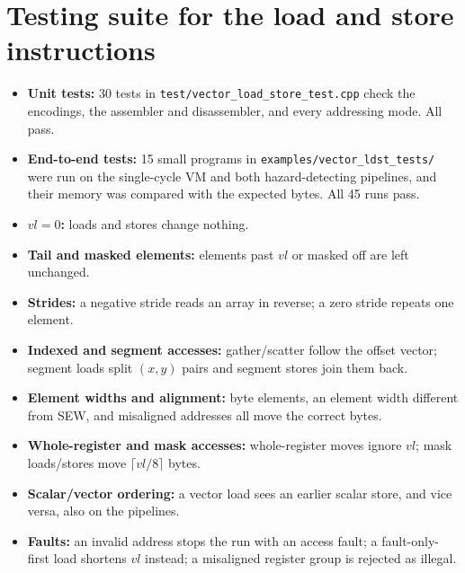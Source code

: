 \documentclass[11pt,a4paper]{article}
\newcommand{\code}[1]{\texttt{#1}}
\begin{document}
\section{Testing suite for the load and store instructions}

\begin{itemize}
  \item \textbf{Unit tests:} 30 tests in \code{test/vector\_load\_store\_test.cpp} check the
        encodings, the assembler and disassembler, and every addressing mode. All pass.
  \item \textbf{End-to-end tests:} 15 small programs in \code{examples/vector\_ldst\_tests/} were
        run on the single-cycle VM and both hazard-detecting pipelines, and their memory was
        compared with the expected bytes. All 45 runs pass.
  \item \textbf{$vl = 0$:} loads and stores change nothing.
  \item \textbf{Tail and masked elements:} elements past $vl$ or masked off are left unchanged.
  \item \textbf{Strides:} a negative stride reads an array in reverse; a zero stride repeats one
        element.
  \item \textbf{Indexed and segment accesses:} gather/scatter follow the offset vector; segment
        loads split $(x, y)$ pairs and segment stores join them back.
  \item \textbf{Element widths and alignment:} byte elements, an element width different from
        SEW, and misaligned addresses all move the correct bytes.
  \item \textbf{Whole-register and mask accesses:} whole-register moves ignore $vl$; mask
        loads/stores move $\lceil vl/8 \rceil$ bytes.
  \item \textbf{Scalar/vector ordering:} a vector load sees an earlier scalar store, and vice
        versa, also on the pipelines.
  \item \textbf{Faults:} an invalid address stops the run with an access fault; a fault-only-first
        load shortens $vl$ instead; a misaligned register group is rejected as illegal.
\end{itemize}
\end{document}
